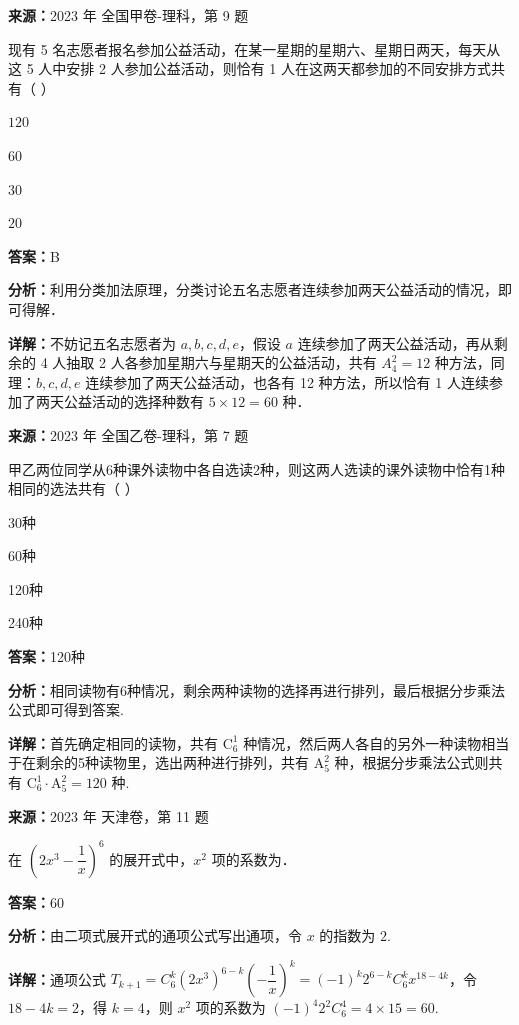 \begin{question}[points=5]
\textbf{来源：}2023 年 全国甲卷-理科，第 9 题\par
现有 5 名志愿者报名参加公益活动，在某一星期的星期六、星期日两天，每天从这 5 人中安排 2 人参加公益活动，则恰有 1 人在这两天都参加的不同安排方式共有（                                    ）
\begin{choices}
  \item $120$
  \item $60$
  \item $30$
  \item $20$
\end{choices}
\begin{solution}
\textbf{答案：}B

\textbf{分析：}利用分类加法原理，分类讨论五名志愿者连续参加两天公益活动的情况，即可得解．

\textbf{详解：}不妨记五名志愿者为 $a,b,c,d,e$，假设 $a$ 连续参加了两天公益活动，再从剩余的 4 人抽取 2 人各参加星期六与星期天的公益活动，共有 $A_4^2 = 12$ 种方法，同理：$b,c,d,e$ 连续参加了两天公益活动，也各有 12 种方法，所以恰有 1 人连续参加了两天公益活动的选择种数有 $5\times 12 = 60$ 种．
\end{solution}
\end{question}

\begin{question}[points=5]
\textbf{来源：}2023 年 全国乙卷-理科，第 7 题\par
甲乙两位同学从6种课外读物中各自选读2种，则这两人选读的课外读物中恰有1种相同的选法共有（ ）
\begin{choices}
  \item 30种
  \item 60种
  \item 120种
  \item 240种
\end{choices}
\begin{solution}
\textbf{答案：}120种

\textbf{分析：}相同读物有6种情况，剩余两种读物的选择再进行排列，最后根据分步乘法公式即可得到答案.

\textbf{详解：}首先确定相同的读物，共有 $\mathrm{C}_6^1$ 种情况，然后两人各自的另外一种读物相当于在剩余的5种读物里，选出两种进行排列，共有 $\mathrm{A}_5^2$ 种，根据分步乘法公式则共有 $\mathrm{C}_6^1\cdot\mathrm{A}_5^2=120$ 种.
\end{solution}
\end{question}

\begin{question}[points=5]
\textbf{来源：}2023 年 天津卷，第 11 题\par
在 $\left(2x^3 - \dfrac{1}{x}\right)^6$ 的展开式中，$x^2$ 项的系数为．
\fillin[{$60$}]
\begin{solution}
\textbf{答案：}$60$

\textbf{分析：}由二项式展开式的通项公式写出通项，令 $x$ 的指数为 $2$.

\textbf{详解：}通项公式 $T_{k+1} = C_6^k (2x^3)^{6-k} \left(-\dfrac{1}{x}\right)^k = (-1)^k 2^{6-k} C_6^k x^{18-4k}$，令 $18-4k=2$，得 $k=4$，则 $x^2$ 项的系数为 $(-1)^4 2^{2} C_6^4 = 4 \times 15 = 60$.
\end{solution}
\end{question}

